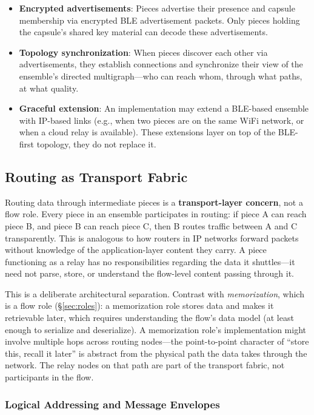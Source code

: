 \documentclass[11pt, letterpaper]{article}
\begin{document}
\begin{itemize}[leftmargin=2em]
  \item \textbf{Encrypted advertisements}: Pieces advertise their presence and capsule
    membership via encrypted BLE advertisement packets. Only pieces holding the capsule's
    shared key material can decode these advertisements.
  \item \textbf{Topology synchronization}: When pieces discover each other via
    advertisements, they establish connections and synchronize their view of the ensemble's
    directed multigraph---who can reach whom, through what paths, at what quality.
  \item \textbf{Graceful extension}: An implementation may extend a BLE-based ensemble
    with IP-based links (e.g., when two pieces are on the same WiFi network, or when a
    cloud relay is available). These extensions layer on top of the BLE-first topology,
    they do not replace it.
\end{itemize}

\subsection{Routing as Transport Fabric}
\label{subsec:routing-fabric}

Routing data through intermediate pieces is a \textbf{transport-layer concern}, not a
flow role. Every piece in an ensemble participates in routing: if piece A can reach
piece B, and piece B can reach piece C, then B routes traffic between A and C
transparently. This is analogous to how routers in IP networks forward packets without
knowledge of the application-layer content they carry. A piece functioning as a relay
has no responsibilities regarding the data it shuttles---it need not parse, store, or
understand the flow-level content passing through it.

This is a deliberate architectural separation. Contrast with \emph{memorization}, which
is a flow role (\S\ref{sec:roles}): a memorization role stores data and makes it
retrievable later, which requires understanding the flow's data model (at least enough to
serialize and deserialize). A memorization role's implementation might involve multiple
hops across routing nodes---the point-to-point character of ``store this, recall it
later'' is abstract from the physical path the data takes through the network. The relay
nodes on that path are part of the transport fabric, not participants in the flow.

\subsubsection{Logical Addressing and Message Envelopes}
\end{document}
